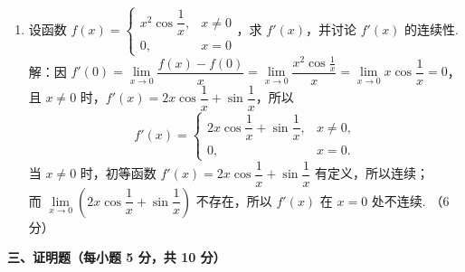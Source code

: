 \documentclass[a4paper,11pt]{ctexart}
\newcommand{\score}[1]{\hfill（#1）}
\begin{document}
\begin{enumerate}[label=\arabic*., start=11, leftmargin=2em, itemsep=1.0em, topsep=0.5em]
  \item 设函数 $f(x) = \begin{cases} x^2 \cos\dfrac{1}{x}, & x\neq 0 \\[0.4em] 0, & x = 0 \end{cases}$，求 $f'(x)$，并讨论 $f'(x)$ 的连续性.\\[0.3em]
  解：因 $f'(0) = \lim\limits_{x\to 0}\dfrac{f(x) - f(0)}{x} = \lim\limits_{x\to 0}\dfrac{x^2\cos\frac{1}{x}}{x} = \lim\limits_{x\to 0} x\cos\dfrac{1}{x} = 0$，\\[0.3em]
  且 $x\neq 0$ 时，$f'(x) = 2x\cos\dfrac{1}{x} + \sin\dfrac{1}{x}$，所以
  \[
    f'(x) = \begin{cases} 2x\cos\dfrac{1}{x} + \sin\dfrac{1}{x}, & x\neq 0, \\[0.4em] 0, & x = 0. \end{cases} \tag*{（3 分）}
  \]
  当 $x\neq 0$ 时，初等函数 $f'(x) = 2x\cos\dfrac{1}{x} + \sin\dfrac{1}{x}$ 有定义，所以连续；\\[0.2em]
  而 $\lim\limits_{x\to 0}\left(2x\cos\dfrac{1}{x} + \sin\dfrac{1}{x}\right)$ 不存在，所以 $f'(x)$ 在 $x = 0$ 处不连续. \score{6 分}
\end{enumerate}

\vspace{0.8em}

\textbf{三、证明题（每小题 5 分，共 10 分）}
\end{document}

